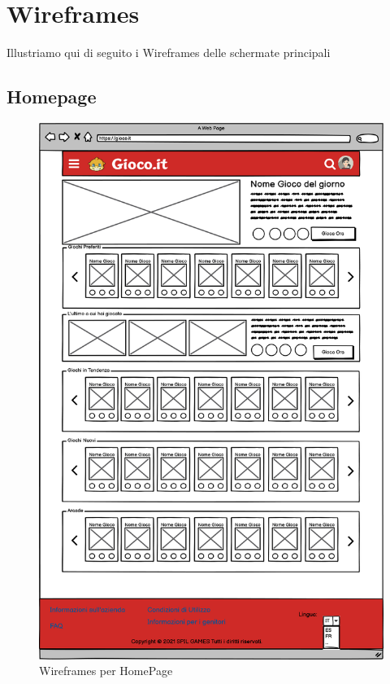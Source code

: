 \documentclass[../Report.tex]{subfiles}
\begin{document}
    \section{Wireframes}
    Illustriamo qui di seguito i Wireframes delle schermate principali

    \subsection{Homepage}
    \begin{figure}
        \includegraphics[width=\linewidth]{WHomepage.png}
        \caption{Wireframes per HomePage}
    \end{figure}
\end{document}
